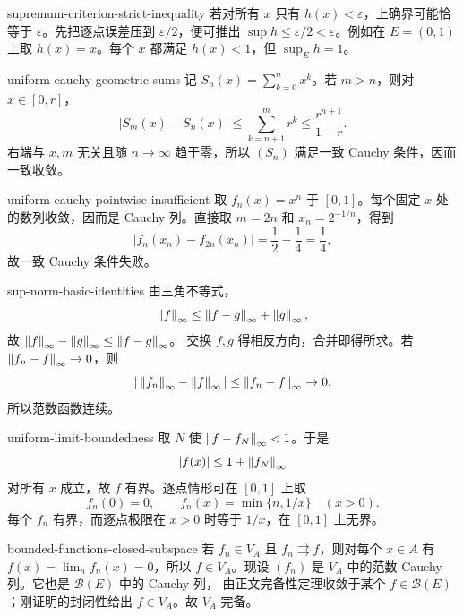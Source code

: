 \begin{solution}{supremum-criterion-strict-inequality}
若对所有 \(x\) 只有 \(h(x)<\varepsilon\)，上确界可能恰等于
\(\varepsilon\)。先把逐点误差压到 \(\varepsilon/2\)，便可推出
\(\sup h\le\varepsilon/2<\varepsilon\)。例如在 \(E=(0,1)\) 上取
\(h(x)=x\)。每个 \(x\) 都满足 \(h(x)<1\)，但 \(\sup_Eh=1\)。
\end{solution}

\begin{solution}{uniform-cauchy-geometric-sums}
记 \(S_n(x)=\sum_{k=0}^nx^k\)。若 \(m>n\)，则对 \(x\in[0,r]\)，
\[
 |S_m(x)-S_n(x)|
 \le\sum_{k=n+1}^m r^k
 \le\frac{r^{n+1}}{1-r}.
\]
右端与 \(x,m\) 无关且随 \(n\to\infty\) 趋于零，所以 \((S_n)\)
满足一致 Cauchy 条件，因而一致收敛。
\end{solution}

\begin{solution}{uniform-cauchy-pointwise-insufficient}
取 \(f_n(x)=x^n\) 于 \([0,1]\)。每个固定 \(x\) 处的数列收敛，因而是
Cauchy 列。直接取 \(m=2n\) 和
\(x_n=2^{-1/n}\)，得到
\[
 |f_n(x_n)-f_{2n}(x_n)|=\frac12-\frac14=\frac14,
\]
故一致 Cauchy 条件失败。
\end{solution}

\begin{solution}{sup-norm-basic-identities}
由三角不等式，
\[
 \left\lVert f\right\rVert_\infty
 \le\left\lVert f-g\right\rVert_\infty+\left\lVert g\right\rVert_\infty,
\]
故 \(\left\lVert f\right\rVert_\infty-\left\lVert g\right\rVert_\infty\le\left\lVert f-g\right\rVert_\infty\)。
交换 \(f,g\) 得相反方向，合并即得所求。若
\(\left\lVert f_n-f\right\rVert_\infty\to0\)，则
\[
 |\left\lVert f_n\right\rVert_\infty-\left\lVert f\right\rVert_\infty|
 \le\left\lVert f_n-f\right\rVert_\infty\to0,
\]
所以范数函数连续。
\end{solution}

\begin{solution}{uniform-limit-boundedness}
取 \(N\) 使 \(\left\lVert f-f_N\right\rVert_\infty<1\)。于是
\[
 |f(x)|\le1+\left\lVert f_N\right\rVert_\infty
\]
对所有 \(x\) 成立，故 \(f\) 有界。逐点情形可在 \([0,1]\) 上取
\[
 f_n(0)=0,\qquad
 f_n(x)=\min\{n,1/x\}\quad(x>0).
\]
每个 \(f_n\) 有界，而逐点极限在 \(x>0\) 时等于 \(1/x\)，在
\([0,1]\) 上无界。
\end{solution}

\begin{solution}{bounded-functions-closed-subspace}
若 \(f_n\in V_A\) 且 \(f_n\rightrightarrows f\)，则对每个 \(x\in A\)
有 \(f(x)=\lim_nf_n(x)=0\)，所以 \(f\in V_A\)。现设 \((f_n)\) 是
\(V_A\) 中的范数 Cauchy 列。它也是 \(\mathcal B(E)\) 中的 Cauchy 列，
由正文完备性定理收敛于某个 \(f\in\mathcal B(E)\)；刚证明的封闭性给出
\(f\in V_A\)。故 \(V_A\) 完备。
\end{solution}

